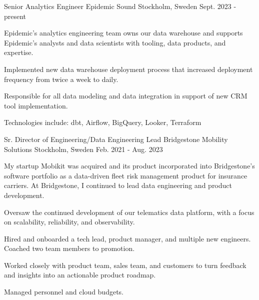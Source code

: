 

\begin{cventries}

  \cventry
    {Senior Analytics Engineer} %
    {Epidemic Sound} %
    {Stockholm, Sweden} %
    {Sept. 2023 - present} %
    {
    Epidemic's analytics engineering team owns our data warehouse and supports Epidemic's analysts
    and data scientists with tooling, data products, and expertise.
    \vspace{5.0mm}
      \begin{cvitems} %
        \item {Implemented new data warehouse deployment process that increased deployment frequency from twice a week to daily.}
        \item {Responsible for all data modeling and data integration in support of new CRM tool implementation.}
        \item {Technologies include: dbt, Airflow, BigQuery, Looker, Terraform}
      \end{cvitems}
    }

  \cventry
    {Sr. Director of Engineering/Data Engineering Lead} %
    {Bridgestone Mobility Solutions} %
    {Stockholm, Sweden} %
    {Feb. 2021 - Aug. 2023} %
    {
    My startup Mobikit was acquired and its product incorporated into Bridgestone's software portfolio as a data-driven fleet risk management product for insurance carriers. At Bridgestone, I continued to lead data engineering and product development.
    \vspace{5.0mm}
      \begin{cvitems} %
        \item {Oversaw the continued development of our telematics data platform, with a focus on scalability, reliability, and observability.}
        \item {Hired and onboarded a tech lead, product manager, and multiple new engineers. Coached two team members to promotion.}
        \item {Worked closely with product team, sales team, and customers to turn feedback and insights into an actionable product roadmap.}
        \item {Managed personnel and cloud budgets.}
      \end{cvitems}
    }


\end{cventries}
